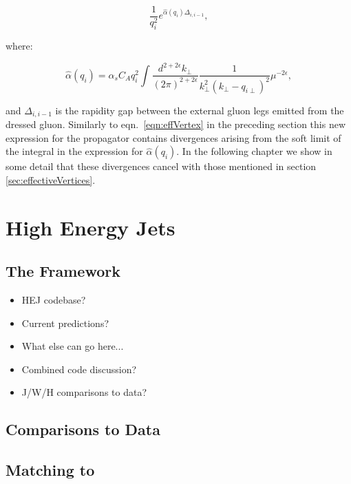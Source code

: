 		\begin{equation}
			\frac{1}{q_i^2}e^{\hat{\alpha}(q_i)\Delta_{i,i-1}},
		\end{equation}

		where:

		\begin{equation}
			\hat{\alpha}(q_i) = \alpha_sC_Aq_i^2\int \frac{d^{2+2\epsilon}k_{\perp}}{(2\pi)^{2+2\epsilon}}
			\frac{1}{k^2_\perp(k_\perp - q_{i\perp})^2}\mu^{-2\epsilon},
		\end{equation}

		and $\Delta_{i,i-1}$ is the rapidity gap between the external gluon legs emitted from
		the dressed gluon.  Similarly to eqn.~\eqref{eqn:effVertex} in the preceding section this
		new expression for the propagator contains divergences arising from the soft limit
		of the integral in the expression for $\hat{\alpha}(q_i)$.  In the following chapter we
		show in some detail that these divergences cancel with those mentioned in section
		\ref{sec:effectiveVertices}.

\chapter{High Energy Jets}
\label{chap:HEJ}

	\section{The \HEJ Framework}

		{\color{red}
		\begin{itemize}
			\item HEJ codebase?
			\item Current predictions?
			\item What else can go here...
			\item Combined code discussion?
			\item J/W/H comparisons to data?
		\end{itemize}
		}

	\section{Comparisons to Data}

	\section{Matching to \ARIADNE}

